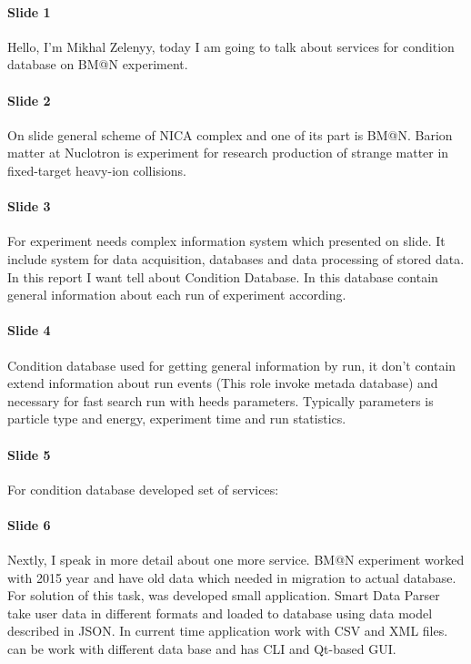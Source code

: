\documentclass[]{article}
\title{}
\author{}
\begin{document}
\maketitle

\begin{abstract}

\end{abstract}


\paragraph{Slide 1} Hello, I'm Mikhal Zelenyy,  today I am going to talk about services for condition database on BM@N  experiment.

\paragraph{Slide 2} On slide general scheme of NICA complex and one of  its part is BM@N.  Barion matter at Nuclotron is experiment for  research production of strange matter in fixed-target heavy-ion collisions. 

\paragraph{Slide 3} For experiment needs complex information system which presented on slide.  It include system for data acquisition, databases and data processing of stored data. In this report I want tell about Condition Database. In this database contain general information about each run of experiment according.

\paragraph{Slide 4} Condition database used for getting general information by run, it don't contain extend information about run events (This role invoke metada database) and necessary for fast search run with heeds parameters. Typically parameters is particle type and energy, experiment time and run statistics.

\paragraph{Slide 5} For condition database developed set of services: 


\paragraph{Slide 6} Nextly, I  speak in more detail about one more service. BM@N experiment worked  with 2015 year and have old data which needed in migration to actual database. For solution of this task, was developed small application. Smart Data Parser  take user data in different formats and  loaded  to database using data model described in JSON. In current time application work with CSV and XML files. can be work with different data base and has CLI and Qt-based GUI. 
\end{document}
